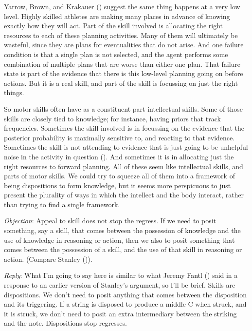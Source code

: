 \documentclass[
  10pt,
  letterpaper,
  DIV=11,
  numbers=noendperiod,
  twoside]{scrartcl}
\begin{document}
Yarrow, Brown, and Krakauer ()
suggest the same thing happens at a very low level. Highly skilled
athletes are making many places in advance of knowing exactly how they
will act. Part of the skill involved is allocating the right resources
to each of these planning activities. Many of them will ultimately be
wasteful, since they are plans for eventualities that do not arise. And
one failure condition is that a single plan is not selected, and the
agent performs some combination of multiple plans that are worse than
either one plan. That failure state is part of the evidence that there
is this low-level planning going on before actions. But it is a real
skill, and part of the skill is focussing on just the right things.

So motor skills often have as a constituent part intellectual skills.
Some of those skills are closely tied to knowledge; for instance, having
priors that track frequencies. Sometimes the skill involved is in
focussing on the evidence that the posterior probability is maximally
sensitive to, and reacting to that evidence. Sometimes the skill is not
attending to evidence that is just going to be unhelpful noise in the
activity in question (). And sometimes it is in allocating just the right
resources to forward planning. All of these seem like intellectual
skills, and parts of motor skills. We could try to squeeze all of them
into a framework of being dispositions to form knowledge, but it seems
more perspicuous to just present the plurality of ways in which the
intellect and the body interact, rather than trying to find a single
framework.

\emph{Objection}: Appeal to skill does not stop the regress. If we need
to posit something, say a skill, that comes between the possession of
knowledge and the use of knowledge in reasoning or action, then we also
to posit something that comes between the possession of a skill, and the
use of that skill in reasoning or action. (Compare Stanley
()).

\emph{Reply}: What I'm going to say here is similar to what Jeremy Fantl
() said in a response to an earlier
version of Stanley's argument, so I'll be brief. Skills are
dispositions. We don't need to posit anything that comes between the
disposition and its triggering. If a string is disposed to produce a
middle C when struck, and it is struck, we don't need to posit an extra
intermediary between the striking and the note. Dispositions stop
regresses.
\end{document}
